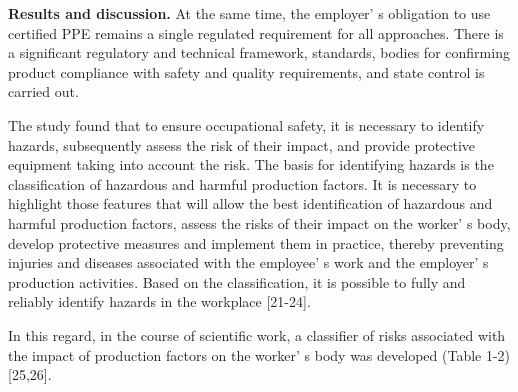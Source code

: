 \begin{multicols}{2}
{\bfseries Results and discussion.} At the same time, the
employer' s obligation to use certified PPE remains a
single regulated requirement for all approaches. There is a significant
regulatory and technical framework, standards, bodies for confirming
product compliance with safety and quality requirements, and state
control is carried out.

The study found that to ensure occupational safety, it is necessary to
identify hazards, subsequently assess the risk of their impact, and
provide protective equipment taking into account the risk. The basis for
identifying hazards is the classification of hazardous and harmful
production factors. It is necessary to highlight those features that
will allow the best identification of hazardous and harmful production
factors, assess the risks of their impact on the
worker' s body, develop protective measures and implement
them in practice, thereby preventing injuries and diseases associated
with the employee' s work and the
employer' s production activities. Based on the
classification, it is possible to fully and reliably identify hazards in
the workplace {[}21-24{]}.

In this regard, in the course of scientific work, a classifier of risks
associated with the impact of production factors on the
worker' s body was developed (Table 1-2) {[}25,26{]}.
\end{multicols}

